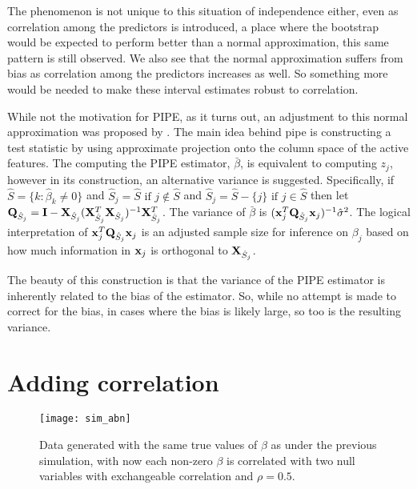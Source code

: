 The phenomenon is not unique to this situation of independence either, even as correlation among the predictors is introduced, a place where the bootstrap would be expected to perform better than a normal approximation, this same pattern is still observed. We also see that the normal approximation suffers from bias as correlation among the predictors increases as well. So something more would be needed to make these interval estimates robust to correlation. 

While not the motivation for PIPE, as it turns out, an adjustment to this normal approximation was proposed by . The main idea behind pipe is constructing a test statistic by using approximate projection onto the column space of the active features. The computing the PIPE estimator, $\bar{\beta}$, is equivalent to computing $z_j$, however in its construction, an alternative variance is suggested. Specifically, if $\hat{S} = \lbrace k: \hat{\beta}_k \neq  0 \rbrace$ and $\hat{S}_j = \hat{S} \text{ if } j \notin \hat{S}$ and $\hat{S}_j = \hat{S} - \lbrace j \rbrace \text{ if } j \in \hat{S}$  then let $\mathbf{Q}_{\hat{S}_j} = \mathbf{I} - \mathbf{X}_{\hat{S}_j}(\mathbf{X}_{\hat{S}_j}^T \mathbf{X}_{\hat{S}_j})^{-1} \mathbf{X}_{\hat{S}_j}^T$. The variance of $\bar{\beta}$ is $(\mathbf{x}_j^T \mathbf{Q}_{\hat{S}_j} \mathbf{x}_j)^{-1}\hat{\sigma}^2$. The logical interpretation of $\mathbf{x}_j^T \mathbf{Q}_{\hat{S}_j} \mathbf{x}_j$ is an adjusted sample size for inference on $\beta_j$ based on how much information in $\mathbf{x}_j$ is orthogonal to $\mathbf{X}_{\hat{S}_j}$. 

The beauty of this construction is that the variance of the PIPE estimator is inherently related to the bias of the estimator. So, while no attempt is made to correct for the bias, in cases where the bias is likely large, so too is the resulting variance.

\section{Adding correlation}

\begin{figure}[hbtp]
    \begin{center}
    \texttt{[image: sim\_abn]}
    \caption{\label{Fig:sim_abn} Data generated with the same true values of $\beta$ as under the previous simulation, with now each non-zero $\beta$ is correlated with two null variables with exchangeable correlation and $\rho = 0.5$.}
    \end{center}
\end{figure}

